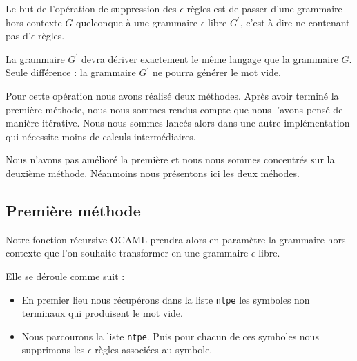 \documentclass[11pt,a4paper]{article}
\def\code#1{\texttt{#1}} %
\begin{document}
Le but de l'opération de suppression des $\epsilon$-règles
est de passer d'une grammaire hors-contexte $G$ quelconque 
à une grammaire $\epsilon$-libre $G^\prime$, c'est-à-dire ne 
contenant pas d'$\epsilon$-règles.

La grammaire $G^\prime$ devra dériver exactement le même
langage que la grammaire $G$. Seule différence : la grammaire
$G^\prime$ ne pourra générer le mot vide.

Pour cette opération nous avons réalisé deux méthodes. Après avoir
terminé la première méthode, nous nous sommes rendus compte que nous l'avons
pensé de manière itérative. Nous nous sommes lancés alors dans une autre 
implémentation qui nécessite moins de calculs intermédiaires.

Nous n'avons pas amélioré la première et nous nous sommes concentrés sur
la deuxième méthode. Néanmoins nous présentons ici les deux méhodes.

\subsection{Première méthode}

Notre fonction récursive OCAML prendra alors en paramètre 
la grammaire hors-contexte que l'on souhaite transformer
en une grammaire $\epsilon$-libre.

Elle se déroule comme suit : 

\begin{itemize}
    \item En premier lieu nous récupérons dans la liste \code{ntpe}
    les symboles non terminaux qui produisent le mot vide. 
    \item Nous parcourons la liste \code{ntpe}. Puis pour chacun de
    ces symboles nous supprimons les $\epsilon$-règles associées au symbole.
\end{itemize}
\end{document}
